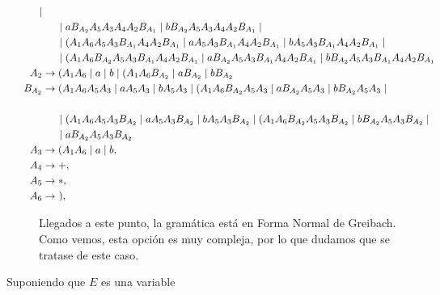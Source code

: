 \documentclass[12pt]{article}
\begin{document}
\begin{ejercicio}[2.5 puntos]
\begin{description}
\begin{align*}
                \mid \\ & \hspace{0.5cm} \mid  a B_{A_2}A_5A_3A_4 A_2 B_{A_1} \mid b B_{A_2}A_5A_3A_4 A_2 B_{A_1}
                \mid \\ & \hspace{0.5cm} \mid (A_1 A_6 A_5 A_3 B_{A_1}A_4 A_2 B_{A_1} \mid aA_5 A_3 B_{A_1}A_4 A_2 B_{A_1} \mid bA_5 A_3 B_{A_1}A_4 A_2 B_{A_1}
                \mid \\ & \hspace{0.5cm}  \mid (A_1 A_6 B_{A_2}A_5 A_3 B_{A_1}A_4 A_2 B_{A_1} \mid  a B_{A_2}A_5 A_3 B_{A_1}A_4 A_2 B_{A_1} \mid b B_{A_2}A_5 A_3 B_{A_1}A_4 A_2 B_{A_1} \\
            \hspace{-2.5cm}A_2 &\to (A_1 A_6 \mid a \mid b \mid (A_1 A_6 B_{A_2} \mid  a B_{A_2} \mid  b B_{A_2} \\
            \hspace{-2.5cm}B_{A_2} & \to (A_1 A_6A_5 A_3 \mid aA_5 A_3 \mid b A_5 A_3\mid (A_1 A_6 B_{A_2}A_5 A_3 \mid  a B_{A_2}A_5 A_3 \mid  b B_{A_2}A_5 A_3
                \mid \\ \hspace{-2.5cm}\\ & \hspace{0.5cm} \mid (A_1 A_6A_5 A_3B_{A_2} \mid aA_5 A_3B_{A_2} \mid b A_5 A_3B_{A_2}\mid (A_1 A_6 B_{A_2}A_5 A_3B_{A_2} \mid  b B_{A_2}A_5 A_3B_{A_2}
                \mid \\ & \hspace{0.5cm} \mid a B_{A_2}A_5 A_3B_{A_2} \\
            \hspace{-2.5cm}A_3 &\to (A_1 A_6 \mid a \mid b,\\
            \hspace{-2.5cm}A_4 &\to +,\\
            \hspace{-2.5cm}A_5 &\to *,\\
            \hspace{-2.5cm}A_6 &\to~),
        \end{align*}

        Llegados a este punto, la gramática está en Forma Normal de Greibach. Como vemos, esta opción es muy compleja, por lo que dudamos que se tratase de este caso.

        \item[Suponiendo que $E$ es una variable]~\\
        

\end{description}
\end{ejercicio}
\end{document}
